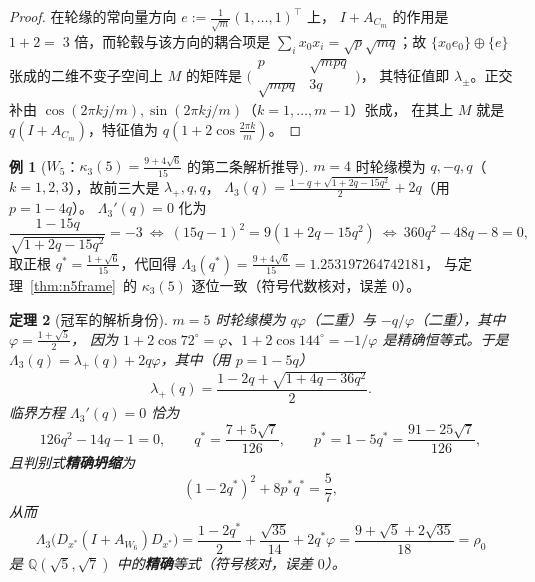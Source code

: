 \documentclass[UTF8,11pt]{ctexart}
\newtheorem{theorem}{定理}[section]
\theoremstyle{definition}
\newtheorem{example}[theorem]{例}
\newcommand{\Lam}{\Lambda}
\newcommand{\Q}{\mathbb{Q}}
\begin{document}
\begin{proof}
在轮缘的常向量方向 $e:=\frac1{\sqrt m}(1,\dots,1)^\top$ 上，
$I+A_{C_m}$ 的作用是 $1+2=\;3$ 倍，而轮毂与该方向的耦合项是
$\sum_i x_0x_i=\sqrt{p}\sqrt{mq}$；故 $\{x_0e_0\}\oplus\{e\}$ 张成的二维不变子空间上
$M$ 的矩阵是 $\bigl(\begin{smallmatrix}p&\sqrt{mpq}\\ \sqrt{mpq}&3q\end{smallmatrix}\bigr)$，
其特征值即 $\lambda_\pm$。正交补由 $\cos(2\pi k j/m),\sin(2\pi k j/m)$（$k=1,\dots,m-1$）张成，
在其上 $M$ 就是 $q(I+A_{C_m})$，特征值为 $q(1+2\cos\frac{2\pi k}m)$。
\end{proof}

\begin{example}[$W_5$：$\kappa_3(5)=\frac{9+4\sqrt6}{15}$ 的第二条解析推导]\label{ex:r20w5}
$m=4$ 时轮缘模为 $q,-q,q$（$k=1,2,3$），故前三大是 $\lambda_+,q,q$，
$\Lam_3(q)=\frac{1-q+\sqrt{1+2q-15q^2}}2+2q$（用 $p=1-4q$）。
$\Lam_3'(q)=0$ 化为
\[
\frac{1-15q}{\sqrt{1+2q-15q^2}}=-3
\ \Longleftrightarrow\ (15q-1)^2=9(1+2q-15q^2)
\ \Longleftrightarrow\ 360q^2-48q-8=0,
\]
取正根 $q^*=\frac{1+\sqrt6}{15}$，代回得 $\Lam_3(q^*)=\frac{9+4\sqrt6}{15}=1.253197264742181$，
与定理~\ref{thm:n5frame}~的 $\kappa_3(5)$ 逐位一致（符号代数核对，误差 $0$）。
\end{example}

\begin{theorem}[冠军的解析身份]\label{thm:r20w6}
$m=5$ 时轮缘模为 $q\varphi$（二重）与 $-q/\varphi$（二重），其中 $\varphi=\frac{1+\sqrt5}2$，
因为 $1+2\cos72^\circ=\varphi$、$1+2\cos144^\circ=-1/\varphi$ 是精确恒等式。于是
$\Lam_3(q)=\lambda_+(q)+2q\varphi$，其中（用 $p=1-5q$）
\[
\lambda_+(q)=\frac{1-2q+\sqrt{1+4q-36q^2}}2 .
\]
临界方程 $\Lam_3'(q)=0$ 恰为
\begin{equation}\label{eq:r20w6quad}
126q^2-14q-1=0,
\qquad q^*=\frac{7+5\sqrt7}{126},\qquad p^*=1-5q^*=\frac{91-25\sqrt7}{126},
\end{equation}
且判别式\textbf{精确坍缩}为
\begin{equation}\label{eq:r20disc}
(1-2q^*)^2+8p^*q^*=\frac57 ,
\end{equation}
从而
\begin{equation}\label{eq:r20rho0}
\Lam_3\bigl(D_{x^*}(I+A_{W_6})D_{x^*}\bigr)
=\frac{1-2q^*}2+\frac{\sqrt{35}}{14}+2q^*\varphi
=\frac{9+\sqrt5+2\sqrt{35}}{18}=\rho_0
\end{equation}
是 $\Q(\sqrt5,\sqrt7)$ 中的\textbf{精确}等式（符号核对，误差 $0$）。
\end{theorem}
\end{document}
